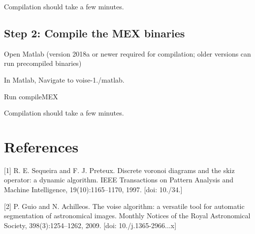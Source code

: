 Compilation should take a few minutes.\hypertarget{index_step2}{}\subsection{Step 2\+: Compile the M\+E\+X binaries}\label{index_step2}

\begin{DoxyEnumerate}
\item Open Matlab (version 2018a or newer required for compilation; older versions can run precompiled binaries)
\item In Matlab, Navigate to {\ttfamily voise-\/1./matlab}.
\item Run {\ttfamily compile\+M\+EX}
\end{DoxyEnumerate}

Compilation should take a few minutes.\hypertarget{index_references_sec}{}\section{References}\label{index_references_sec}
\mbox{[}1\mbox{]} R. E. Sequeira and F. J. Preteux. Discrete voronoi diagrams and the skiz operator\+: a dynamic algorithm. I\+E\+EE Transactions on Pattern Analysis and Machine Intelligence, 19(10)\+:1165–1170, 1997. \mbox{[}doi\+: 10./34.\mbox{]}

\mbox{[}2\mbox{]} P. Guio and N. Achilleos. The voise algorithm\+: a versatile tool for automatic segmentation of astronomical images. Monthly Notices of the Royal Astronomical Society, 398(3)\+:1254–1262, 2009. \mbox{[}doi\+: 10./j.1365-\/2966...\+x\mbox{]} 